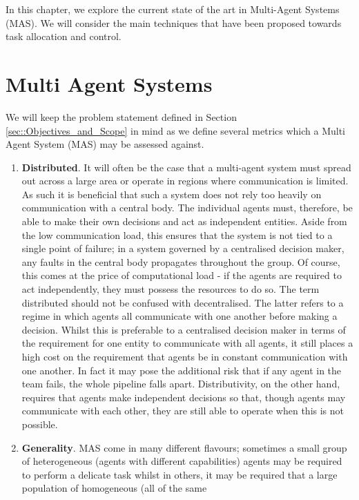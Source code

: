 \documentclass[.../main.tex]{subfiles}
\begin{document}
In this chapter, we explore the current state of the art in Multi-Agent Systems (MAS). We will
consider the main techniques that have been proposed towards task allocation and control. 

\section{Multi Agent Systems} \label{sec::Multi_Agent_Systems}

We will keep the problem statement defined in Section \ref{sec::Objectives_and_Scope} in mind as
we define several metrics which a Multi Agent System (MAS) may be assessed against.

\begin{enumerate}
    \item \textbf{Distributed}. It will often be the case that a multi-agent system must spread out
across a large area or operate in regions where communication is limited. As such it is beneficial
that such a system does not rely too heavily on communication with a central body. The individual
agents must, therefore, be able to make their own decisions and act as independent entities. Aside
from the low communication load, this ensures that the system is not tied to a single point of
failure; in a system governed by a centralised decision maker, any faults in the central body
propagates throughout the group. Of course, this comes at the price of computational load - if the
agents are required to act independently, they must possess the resources to do so. The term
distributed should not be confused with decentralised. The latter refers to a regime in which agents
all communicate with one another before making a decision. Whilst this is preferable to a
centralised decision maker in terms of the requirement for one entity to communicate with all
agents, it still places a high cost on the requirement that agents be in constant communication with
one another. In fact it may pose the additional risk that if any agent in the team fails, the whole
pipeline falls apart. Distributivity, on the other hand, requires that agents make independent
decisions so that, though agents may communicate with each other, they are still able to operate
when this is not possible.
    \item \textbf{Generality}. MAS come in many different flavours; sometimes a small group of
heterogeneous  (agents with different capabilities) agents may be required to perform a delicate
task whilst in others, it may be required that a large population of homogeneous (all of the same

\end{enumerate}
\end{document}
